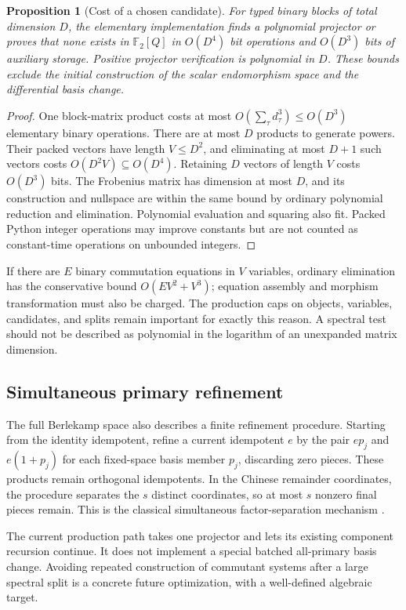 \documentclass[11pt,a4paper]{article}
\newtheorem{proposition}[theorem]{Proposition}
\theoremstyle{definition}\newtheorem{definition}[theorem]{Definition}
\theoremstyle{remark}\newtheorem{remark}[theorem]{Remark}
\newcommand{\F}{\mathbb F_2}
\begin{document}
\begin{proposition}[Cost of a chosen candidate]\label{prop:cost}
For typed binary blocks of total dimension $D$, the elementary implementation
finds a polynomial projector or proves that none exists in $\F[Q]$ in
$O(D^4)$ bit operations and $O(D^3)$ bits of auxiliary storage. Positive
projector verification is polynomial in $D$. These bounds exclude the
initial construction of the scalar endomorphism space and the differential
basis change.
\end{proposition}
\begin{proof}
One block-matrix product costs at most
$O(\sum_\tau d_\tau^3)\le O(D^3)$ elementary binary operations. There are at
most $D$ products to generate powers. Their packed vectors have length
$V\le D^2$, and eliminating at most $D+1$ such vectors costs
$O(D^2V)\subseteq O(D^4)$. Retaining $D$ vectors of length $V$ costs
$O(D^3)$ bits. The Frobenius matrix has dimension at most $D$, and its
construction and nullspace are within the same bound by ordinary polynomial
reduction and elimination. Polynomial evaluation and squaring also fit.
Packed Python integer operations may improve constants but are not counted
as constant-time operations on unbounded integers.
\end{proof}

If there are $E$ binary commutation equations in $V$ variables, ordinary
elimination has the conservative bound $O(EV^2+V^3)$; equation assembly and
morphism transformation must also be charged. The production caps on objects,
variables, candidates, and splits remain important for exactly this reason.
A spectral test should not be described as polynomial in the logarithm of
an unexpanded matrix dimension.

\subsection{Simultaneous primary refinement}

The full Berlekamp space also describes a finite refinement procedure. Starting
from the identity idempotent, refine a current idempotent $e$ by the pair
$ep_j$ and $e(1+p_j)$ for each fixed-space basis member $p_j$, discarding zero
pieces. These products remain orthogonal idempotents. In the Chinese
remainder coordinates, the procedure separates the $s$ distinct coordinates,
so at most $s$ nonzero final pieces remain. This is the classical simultaneous
factor-separation mechanism \cite{berlekamp}.

The current production path takes one projector and lets its existing
component recursion continue. It does not implement a special batched
all-primary basis change. Avoiding repeated construction of commutant
systems after a large spectral split is a concrete future optimization,
with a well-defined algebraic target.
\end{document}
